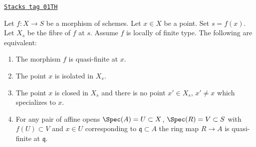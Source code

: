 \begin{lemma}
\label{morphisms-lemma-quasi-finite-at-point-characterize}
\href{https://stacks.math.columbia.edu/tag/01TH}{\texttt{Stacks tag 01TH}}

Let $f : X \to S$ be a morphism of schemes.
Let $x \in X$ be a point. Set $s = f(x)$.
Let $X_s$ be the fibre of $f$ at $s$.
Assume $f$ is locally of finite type.
The following are equivalent:
\begin{enumerate}
\item The morphism $f$ is quasi-finite at $x$.
\item The point $x$ is isolated in $X_s$.
\item The point $x$ is closed in $X_s$
and there is no point $x' \in X_s$, $x' \not = x$
which specializes to $x$.
\item For any pair of affine opens
$\Spec(A) = U \subset X$, $\Spec(R) = V \subset S$ with
$f(U) \subset V$ and $x \in U$ corresponding to $\mathfrak q \subset A$
the ring map $R \to A$ is quasi-finite at $\mathfrak q$.
\end{enumerate}
\end{lemma}

